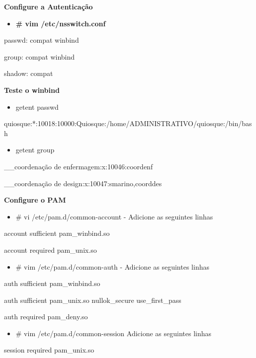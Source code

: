 \textbf{Configure a Autenticação}

\begin{itemize}
	\item \textbf{\# vim /etc/nsswitch.conf}
\end{itemize}

	passwd:         compat winbind

	group:          compat winbind

	shadow:         compat

\textbf{Teste o winbind}

\begin{itemize}
	\item {getent passwd}
\end{itemize}

quiosque:*:10018:10000:Quiosque:/home/ADMINISTRATIVO/quiosque:/bin/bash

\begin{itemize}
	\item {getent group}
\end{itemize}

\_\_coordenação de enfermagem:x:10046:coordenf

\_\_coordenação de design:x:10047:smarino,coorddes

\textbf{Configure o PAM}

\begin{itemize}
	\item {\# vi /etc/pam.d/common-account} - Adicione as seguintes linhas
\end{itemize}

account sufficient       pam\_winbind.so

account required         pam\_unix.so

\begin{itemize}
	\item {\# vim /etc/pam.d/common-auth} - Adicione as seguintes linhas
\end{itemize}

auth sufficient pam\_winbind.so

auth sufficient pam\_unix.so nullok\_secure use\_first\_pass

auth required   pam\_deny.so

\begin{itemize}
	\item {\# vim /etc/pam.d/common-session} Adicione as seguintes linhas
\end{itemize}

session required pam\_unix.so

